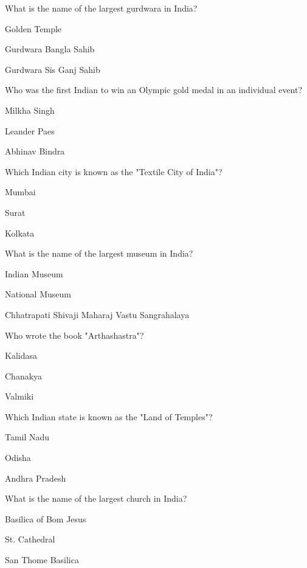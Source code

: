 \begin{enhancedmcq}{What is the name of the largest gurdwara in India?}
\item Golden Temple
\item Gurdwara Bangla Sahib
\item Gurdwara Sis Ganj Sahib

\end{enhancedmcq}
\begin{enhancedmcq}{Who was the first Indian to win an Olympic gold medal in an individual event?}
\item Milkha Singh
\item Leander Paes
\item Abhinav Bindra

\end{enhancedmcq}
\begin{enhancedmcq}{Which Indian city is known as the "Textile City of India"?}
\item Mumbai
\item Surat
\item Kolkata

\end{enhancedmcq}
\begin{enhancedmcq}{What is the name of the largest museum in India?}
\item Indian Museum
\item National Museum
\item Chhatrapati Shivaji Maharaj Vastu Sangrahalaya

\end{enhancedmcq}
\begin{enhancedmcq}{Who wrote the book "Arthashastra"?}
\item Kalidasa
\item Chanakya
\item Valmiki

\end{enhancedmcq}
\begin{enhancedmcq}{Which Indian state is known as the "Land of Temples"?}
\item Tamil Nadu
\item Odisha
\item Andhra Pradesh

\end{enhancedmcq}
\begin{enhancedmcq}{What is the name of the largest church in India?}
\item Basilica of Bom Jesus
\item St. Cathedral
\item San Thome Basilica

\end{enhancedmcq}
